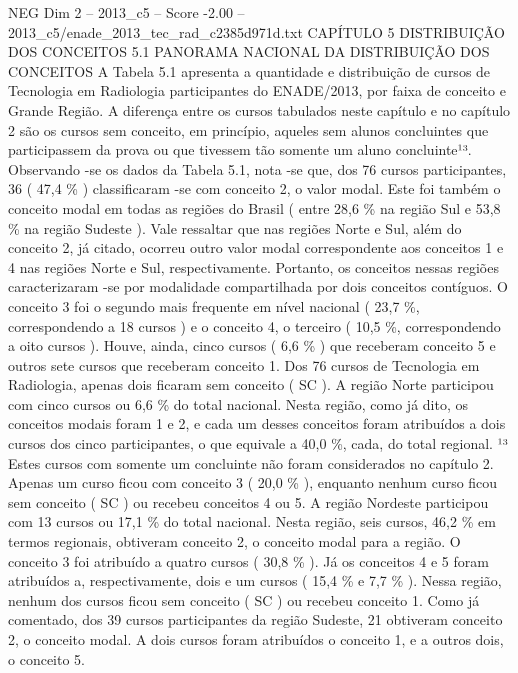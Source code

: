 \begin{textsample}{NEG Dim 2 – 2013\_c5 – Score -2.00 – 2013\_c5/enade\_2013\_tec\_rad\_c2385d971d.txt}  \label{ex:f2_neg_068}
CAPÍTULO 5 DISTRIBUIÇÃO DOS CONCEITOS 5.1 PANORAMA NACIONAL DA DISTRIBUIÇÃO DOS CONCEITOS A Tabela 5.1 apresenta a quantidade e distribuição de cursos de Tecnologia em Radiologia participantes do ENADE/2013, por faixa de conceito e Grande Região.
A diferença entre os cursos tabulados neste capítulo e no capítulo 2 são os cursos sem conceito, em princípio, aqueles sem alunos concluintes que participassem da prova ou que tivessem tão somente um aluno concluinte¹³.
Observando -se os dados da Tabela 5.1, nota -se que, dos 76 cursos participantes, 36 ( 47,4 \% ) classificaram -se com conceito 2, o valor modal.
Este foi também o conceito modal em todas as regiões do Brasil ( entre 28,6 \% na região Sul e 53,8 \% na região Sudeste ).
Vale ressaltar que nas regiões Norte e Sul, além do conceito 2, já citado, ocorreu outro valor modal correspondente aos conceitos 1 e 4 nas regiões Norte e Sul, respectivamente.
Portanto, os conceitos nessas regiões caracterizaram -se por modalidade compartilhada por dois conceitos contíguos.
O conceito 3 foi o segundo mais frequente em nível nacional ( 23,7 \%, correspondendo a 18 cursos ) e o conceito 4, o terceiro ( 10,5 \%, correspondendo a oito cursos ).
Houve, ainda, cinco cursos ( 6,6 \% ) que receberam conceito 5 e outros sete cursos que receberam conceito 1.
Dos 76 cursos de Tecnologia em Radiologia, apenas dois ficaram sem conceito ( SC ).
A região Norte participou com cinco cursos ou 6,6 \% do total nacional.
Nesta região, como já dito, os conceitos modais foram 1 e 2, e cada um desses conceitos foram atribuídos a dois cursos dos cinco participantes, o que equivale a 40,0 \%, cada, do total regional. ¹³ Estes cursos com somente um concluinte não foram considerados no capítulo 2.
Apenas um curso ficou com conceito 3 ( 20,0 \% ), enquanto nenhum curso ficou sem conceito ( SC ) ou recebeu conceitos 4 ou 5.
A região Nordeste participou com 13 cursos ou 17,1 \% do total nacional.
Nesta região, seis cursos, 46,2 \% em termos regionais, obtiveram conceito 2, o conceito modal para a região.
O conceito 3 foi atribuído a quatro cursos ( 30,8 \% ).
Já os conceitos 4 e 5 foram atribuídos a, respectivamente, dois e um cursos ( 15,4 \% e 7,7 \% ).
Nessa região, nenhum dos cursos ficou sem conceito ( SC ) ou recebeu conceito 1.
Como já comentado, dos 39 cursos participantes da região Sudeste, 21 obtiveram conceito 2, o conceito modal.
A dois cursos foram atribuídos o conceito 1, e a outros dois, o conceito 5.

\end{textsample}
